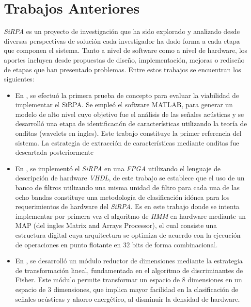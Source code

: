 \section{Trabajos Anteriores}

\textit{SiRPA} es un proyecto de investigación que ha sido explorado y analizado desde diversas perspectivas de solución cada investigador ha dado forma a cada etapa que componen el sistema. Tanto a nivel de software como a nivel de hardware, los aportes incluyen desde propuestas de diseño, implementación, mejoras o rediseño de etapas que han presentado problemas. Entre estos trabajos se encuentran los siguientes:

\begin{itemize}

\item {En \cite{MSaenz}, se efectuó la primera prueba de concepto para evaluar la viabilidad de implementar el SiRPA. Se empleó el software MATLAB, para generar un modelo de alto nivel cuyo objetivo fue el análisis de las señales acústicas y se desarrolló una etapa de identificación de características utilizando la teoría de onditas (wavelets en ingles). Este trabajo constituye la primer referencia del sistema. La estrategia de extracción de características mediante onditas fue descartada posteriormente}

\item {En \cite{Esalas}, se implementó el \textit{SiRPA} en una \textit{FPGA} utilizando el lenguaje de descripción de hardware \textit{VHDL}, de este trabajo se establece que el uso de un banco de filtros utilizando una misma unidad de filtro para cada una de las ocho bandas constituye una metodología de clasificación idónea para los requerimientos de hardware del \textit{SiRPA}. Es en este trabajo donde se intenta implementar por primera vez el algoritmo de \textit{HMM} en hardware mediante un MAP (del ingles Matrix and Arrays Processor), el cual consiste una estructura digital cuya arquitectura se optimiza de acuerdo con la ejecución de operaciones en punto flotante en 32 bits de forma combinacional.}

\item {En \cite{Msequeira}, se desarrolló un módulo reductor de dimensiones mediante la estrategia de transformación lineal, fundamentada en el algoritmo de discriminantes de Fisher. Este módulo permite transformar un espacio de 8 dimensiones en un espacio de 3 dimensiones, que implica mayor facilidad en la clasificación de señales acústicas y ahorro energético, al disminuir la densidad de hardware.}


\end{itemize}
